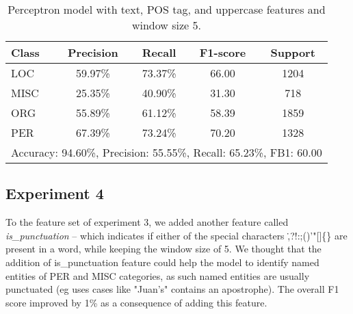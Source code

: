 \documentclass[12pt]{report}
\begin{document}
\begin{table}[h]
	\centering
	\label{tab:exp3}
	\begin{tabular}{lcccc}
		\hline
		\textbf{Class} & \textbf{Precision} & \textbf{Recall} & \textbf{F1-score} & \textbf{Support} \\ \hline
		LOC            & 59.97\%            & 73.37\%         & 66.00             & 1204             \\ \hline
		MISC           & 25.35\%            & 40.90\%         & 31.30             & 718              \\ \hline
		ORG            & 55.89\%            & 61.12\%         & 58.39             & 1859             \\ \hline
		PER            & 67.39\%            & 73.24\%         & 70.20             & 1328             \\
		\hline
		\multicolumn{5}{c}{Accuracy: 94.60\%, Precision: 55.55\%, Recall: 65.23\%, FB1: 60.00}       \\ \hline
	\end{tabular}
	\caption{Perceptron model with text, POS tag, and uppercase features and window size 5.}
\end{table}

\pagebreak

\subsection*{Experiment 4}

To the feature set of experiment 3, we added another feature called \textit{is\_punctuation} – which indicates if either of the special characters \.,?!:;()'"[]\{\} are present in a word, while keeping the window size of 5. We thought that the addition of is\_punctuation feature could help the model to identify named entities of PER and MISC categories, as such named entities are usually punctuated (eg uses cases like "Juan's" contains an apostrophe). The overall F1 score improved by 1\% as a consequence of adding this feature.
\end{document}
